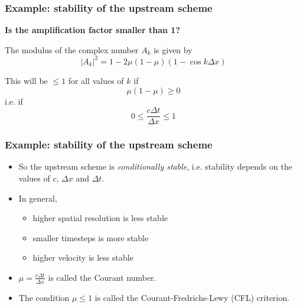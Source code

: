 \documentclass[aspectratio=43,9pt]{beamer}
\begin{document}
%
%
\begin{frame}
	\frametitle{Example: stability of the upstream scheme}
	\textbf{Is the amplification factor smaller than 1?}
\pause
\par\vspace*{2ex}
	The modulus of the complex number $A_k$ is given by
	\begin{equation*}
		| A_k |^2 = 1 - 2 \mu \left( 1 -\mu \right) \left( 1 - \cos k \Delta x \right)
	\end{equation*}
\pause
	\par\vspace*{2ex}
	This will be $\le 1$ for all values of $k$ if
	\begin{equation*}
		\mu \left( 1 - \mu \right) \ge 0
	\end{equation*}
	i.e. if
	\begin{equation*}
		0 \le \frac{c \Delta t }{\Delta x} \le 1
	\end{equation*}
\end{frame}
%
%
\begin{frame}
	\frametitle{Example: stability of the upstream scheme}
	\begin{itemize}
		\item So the upstream scheme is \emph{conditionally stable}, i.e. stability depends on the values of $c$, $\Delta x$ and $\Delta t$.\\[4ex]
		\item In general,
			\begin{itemize}
				\item higher spatial resolution is less stable
				\item smaller timesteps is more stable
				\item higher velocity is less stable\\[4ex]
			\end{itemize}
		\item $\mu=\frac{c \Delta t }{\Delta x}$ is called the Courant number.\\[4ex]
		\item The condition $\mu\leq 1$ is called the Courant-Fredrichs-Lewy (CFL) criterion.
	\end{itemize}
\end{frame}
%
%
\end{document}
